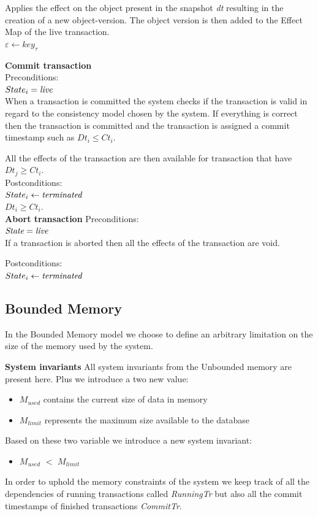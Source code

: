 \documentclass[systeme]{compas2022}
\begin{document}
Applies the effect on the object present in the snapshot \emph{dt} resulting in the creation of a new object-version.
The object version is then added to the Effect Map of the live transaction.\\
$\varepsilon \leftarrow key_{\tau}$

\textbf{Commit transaction}\\
Preconditions:\\ 
$State_i = \emph{live}$ \\

When a transaction is committed the system checks if the transaction is valid in regard to the consistency model chosen by the system.
If everything is correct then the transaction is committed and the transaction is assigned a commit timestamp such as $Dt_i \leq Ct_i$.

All the effects of the transaction are then available for transaction that have $Dt_j \geq Ct_i$.\\

Postconditions:\\
$State_i \leftarrow \emph{terminated}$ \\
$Dt_i \geq Ct_i$.\\



\textbf{Abort transaction}
Preconditions:\\ 
$\emph{State} = \emph{live}$ \\

If a transaction is aborted then all the effects of the transaction are void.

Postconditions:\\
$State_i \leftarrow \emph{terminated}$ \\

\subsection{Bounded Memory}

In the Bounded Memory model we choose to define an arbitrary limitation on the size of the memory used by the system.

\textbf{System invariants}
All system invariants from the Unbounded memory are present here.
Plus we introduce a two new value:
\begin{itemize}
  \item \emph{$M_{used}$} contains the current size of data in memory
  \item \emph{$M_{limit}$} represents the maximum size available to the database
\end{itemize}
Based on these two variable we introduce a new system invariant:
\begin{itemize}
  \item \emph{$M_{used}$} $<$ \emph{$M_{limit}$}
\end{itemize}
In order to uphold the memory constraints of the system we keep track of all the dependencies of running transactions called \emph{RunningTr} but also all the commit timestamps of finished transactions \emph{CommitTr}.
\end{document}
